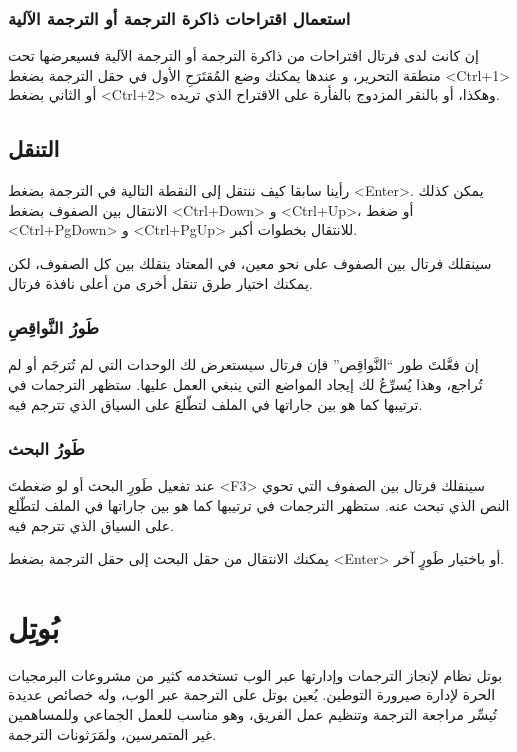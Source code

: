 \subsubsection[ref:36543315]{استعمال اقتراحات ذاكرة الترجمة أو الترجمة الآلية}


إن كانت لدى فرتال اقتراحات من ذاكرة الترجمة أو الترجمة الآلية فسيعرضها
تحت منطقة التحرير، و عندها يمكنك وضع المُقتَرَحِ الأول في حقل الترجمة
بضغط <Ctrl+1> أو الثاني بضغط <Ctrl+2> وهكذا، أو بالنقر المزدوج بالفأرة
على الاقتراح الذي تريده.

\subsection{التنقل}
رأينا سابقا كيف ننتقل إلى النقطة التالية في الترجمة بضغط <Enter>. يمكن
كذلك الانتقال بين الصفوف بضغط <Ctrl+Down> و <Ctrl+Up>، أو ضغط
<Ctrl+PgDown> و <Ctrl+PgUp> للانتقال بخطوات أكبر.

سينقلك فرتال بين الصفوف على نحو معين، في المعتاد ينقلك بين كل الصفوف،
لكن يمكنك اختيار طرق تنقل أخرى من أعلى نافذة فرتال.

\subsubsection{طَورُ النَّواقِصِ}
إن فعَّلتَ طور “النَّواقِص” فإن فرتال سيستعرض لك الوحدات التي لم تُترجَم
أو لم تُراجع، وهذا يُسرِّعُ لك إيجاد المواضع التي ينبغي العمل عليها.
ستظهر الترجمات في ترتيبها كما هو بين جاراتها في الملف لتطّلعَ على
السياق الذي تترجم فيه.

\subsubsection{طَورُ البحث}
عند تفعيل طَورِ البحث أو لو ضغطتَ <F3> سينقلك فرتال بين الصفوف التي تحوي
النص الذي تبحث عنه. ستظهر الترجمات في ترتيبها كما هو بين جاراتها في
الملف لتطّلع على السياق الذي تترجم فيه.

يمكنك الانتقال من حقل البحث إلى حقل الترجمة بضغط <Enter> أو باختيار
طَورٍ آخر.

\section{بُوتِل}
بوتل نظام لإنجاز الترجمات وإدارتها عبر الوب تستخدمه كثير من مشروعات
البرمجيات الحرة لإدارة صيرورة التوطين. يُعين بوتل على الترجمة عبر الوب،
وله خصائص عديدة تُيسِّر مراجعة الترجمة وتنظيم عمل الفريق، وهو مناسب
للعمل الجماعي وللمساهمين غير المتمرسين، ولمَرَثونات الترجمة.

